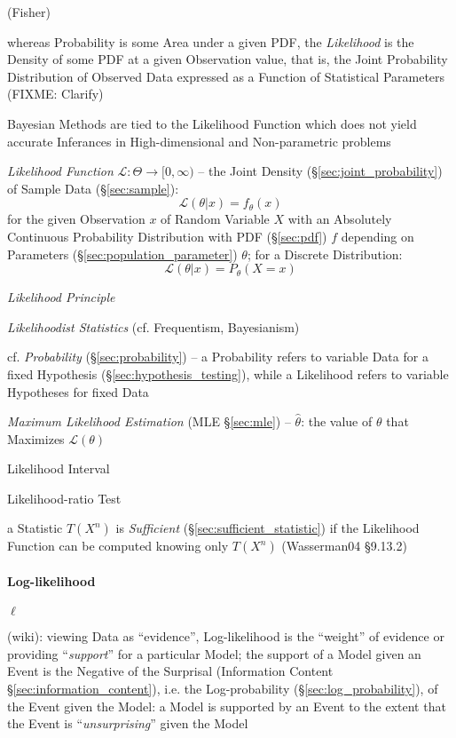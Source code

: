(Fisher)

whereas Probability is some Area under a given PDF, the \emph{Likelihood} is the
Density of some PDF at a given Observation value, that is, the Joint Probability
Distribution of Observed Data expressed as a Function of Statistical Parameters
(FIXME: Clarify)

\fist Bayesian Methods are tied to the Likelihood Function which does not yield
accurate Inferances in High-dimensional and Non-parametric problems

\emph{Likelihood Function} $\mathcal{L} : \Theta \to [0, \infty)$ -- the
  Joint Density (\S\ref{sec:joint_probability}) of Sample Data
  (\S\ref{sec:sample}):
\[
  \mathcal{L}(\theta | x) = f_\theta(x)
\]
for the given Observation $x$ of Random Variable $X$ with an Absolutely
Continuous Probability Distribution with PDF (\S\ref{sec:pdf}) $f$ depending on
Parameters (\S\ref{sec:population_parameter}) $\theta$; for a Discrete
Distribution:
\[
  \mathcal{L}(\theta | x) = P_\theta(X = x)
\]

\emph{Likelihood Principle}

\emph{Likelihoodist Statistics} (cf. Frequentism, Bayesianism)

cf. \emph{Probability} (\S\ref{sec:probability}) -- a Probability refers to
variable Data for a fixed Hypothesis (\S\ref{sec:hypothesis_testing}), while a
Likelihood refers to variable Hypotheses for fixed Data

\emph{Maximum Likelihood Estimation} (MLE \S\ref{sec:mle}) -- $\hat{\theta}$:
the value of $\theta$ that Maximizes $\mathcal{L}(\theta)$

Likelihood Interval

Likelihood-ratio Test

\fist a Statistic $T(X^n)$ is \emph{Sufficient}
(\S\ref{sec:sufficient_statistic}) if the Likelihood Function can be computed
knowing only $T(X^n)$ (Wasserman04 \S9.13.2)



\paragraph{Log-likelihood}\label{sec:log_likelihood}\hfill

$\ell$

(wiki): viewing Data as ``evidence'', Log-likelihood is the ``weight'' of
evidence or providing ``\emph{support}'' for a particular Model; the support of
a Model given an Event is the Negative of the Surprisal (Information Content
\S\ref{sec:information_content}), i.e. the Log-probability
(\S\ref{sec:log_probability}), of the Event given the Model: a Model is
supported by an Event to the extent that the Event is ``\emph{unsurprising}''
given the Model


